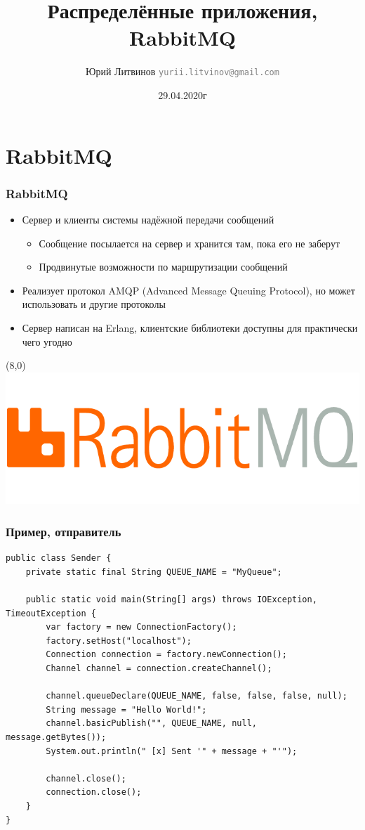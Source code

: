 \documentclass[xetex,mathserif,serif]{beamer}
\title{Распределённые приложения, RabbitMQ}
\author[Юрий Литвинов]{Юрий Литвинов \newline \textcolor{gray}{\small\texttt{yurii.litvinov@gmail.com}}}
\date{29.04.2020г}
\begin{document}
	\frame{\titlepage}

	\section{RabbitMQ}

	\begin{frame}
		\frametitle{RabbitMQ}
		\begin{itemize}
			\item Сервер и клиенты системы надёжной передачи сообщений
			\begin{itemize}
				\item Сообщение посылается на сервер и хранится там, пока его не заберут
				\item Продвинутые возможности по маршрутизации сообщений
			\end{itemize}
			\item Реализует протокол AMQP (Advanced Message Queuing Protocol), но может использовать и другие протоколы
			\item Сервер написан на Erlang, клиентские библиотеки доступны для практически чего угодно
		\end{itemize}
		\begin{textblock}{3}(8,0)
			\includegraphics[width=\textwidth]{rabbitmqLogo.png}
		\end{textblock}
	\end{frame}

	\begin{frame}[fragile]
		\frametitle{Пример, отправитель}
		\begin{ssmall}
			\begin{verbatim}
public class Sender {
    private static final String QUEUE_NAME = "MyQueue";

    public static void main(String[] args) throws IOException, TimeoutException {
        var factory = new ConnectionFactory();
        factory.setHost("localhost");
        Connection connection = factory.newConnection();
        Channel channel = connection.createChannel();

        channel.queueDeclare(QUEUE_NAME, false, false, false, null);
        String message = "Hello World!";
        channel.basicPublish("", QUEUE_NAME, null, message.getBytes());
        System.out.println(" [x] Sent '" + message + "'");

        channel.close();
        connection.close();
    }
}
			\end{verbatim}
		\end{ssmall}
	\end{frame}
\end{document}
